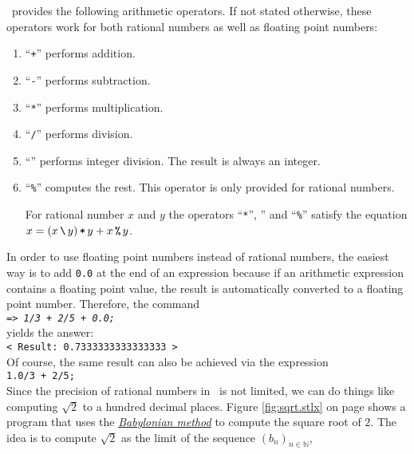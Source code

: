 \setlx\ provides the following arithmetic operators.  If not stated otherwise, these operators work
for both rational numbers as well as floating point numbers:
\begin{enumerate}
\item ``\texttt{+}'' performs addition.
\item ``\texttt{-}'' performs subtraction.
\item ``\texttt{*}'' performs multiplication.
\item ``\texttt{/}'' performs division.
\item ``\texttt{}'' performs integer division.
      The result is always an integer.
\item ``\texttt{\%}'' computes the rest.  This operator is only provided for rational numbers.

      For rational number $x$ and $y$ the operators ``\texttt{*}'', \texttt{}'' and ``\texttt{\%}'' 
      satisfy the equation
      \\[0.2cm]
      \hspace*{1.3cm}
      $x = (x \,\texttt{\symbol{92}}\, y) \,\texttt{*}\, y + x\,\texttt{\%}\, y$.
\end{enumerate}
In order to use floating point numbers instead of rational numbers, the easiest way is to add
\texttt{0.0} at the end of an expression because if an arithmetic expression 
contains a floating point value, the result is automatically converted to a floating point number.
Therefore, the command
\\[0.2cm]
\hspace*{1.3cm}
\texttt{=> \textsl{1/3 + 2/5 + 0.0;}}
\\[0.2cm]
yields the answer:
\\[0.2cm]
\hspace*{1.3cm}
\texttt{< Result: 0.7333333333333333 >}
\\[0.2cm]
Of course, the same result can also be achieved via the expression
\\[0.2cm]
\hspace*{1.3cm}
\texttt{1.0/3 + 2/5;}
\\[0.2cm]
Since the precision of rational numbers in \setlx\ is not limited, we can do things like computing
$\sqrt{2}$ to a hundred decimal places.  Figure \ref{fig:sqrt.stlx} on page \pageref{fig:sqrt.stlx}
shows a program that uses the 
\href{http://en.wikipedia.org/wiki/Methods_of_computing_square_roots#Babylonian_method}{\emph{Babylonian method}}
to compute the square root of $2$.  The idea is to compute $\sqrt{2}$ as the limit of the sequence $(b_n)_{n\in\mathbb{N}}$, 
